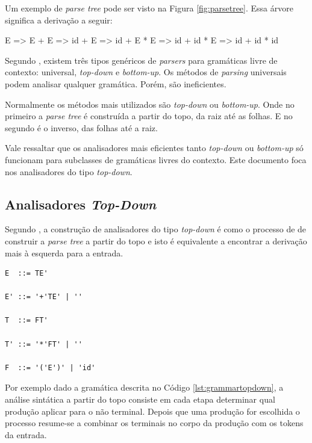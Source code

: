 Um exemplo de \textit{parse tree} pode ser visto na Figura \ref{fig:parsetree}. Essa árvore significa a derivação
a seguir:

\begin{center}
    E => E + E => id + E => id + E * E => id + id * E => id + id * id
\end{center}

Segundo \cite{aho2006}, existem três tipos genéricos de \textit{parsers} para gramáticas 
livre de contexto: universal, \textit{top-down} e \textit{bottom-up}. Os métodos de \textit{parsing}
universais podem analisar qualquer gramática. Porém, são ineficientes.

Normalmente os métodos mais utilizados são  \textit{top-down} ou \textit{bottom-up}. Onde no primeiro
a \textit{parse tree} é construída a partir do topo, da raiz até as folhas. E no segundo é o inverso,
das folhas até a raiz. 

Vale ressaltar que os analisadores mais eficientes tanto \textit{top-down} ou \textit{bottom-up}  
só funcionam para subclasses de gramáticas livres do contexto. Este documento foca nos analisadores
do tipo \textit{top-down}.

\subsection{Analisadores \textit{Top-Down}}

Segundo \cite{aho2006}, a construção de analisadores do tipo \textit{top-down} é como o processo de
de construir a \textit{parse tree} a partir do topo e isto é
equivalente a encontrar a derivação mais à esquerda para a entrada.

\begin{lstlisting}[caption=Exemplo de gramática para analisadores top-down,label={lst:grammartopdown}]
E  ::= TE'

E' ::= '+'TE' | ''

T  ::= FT'

T' ::= '*'FT' | ''

F  ::= '('E')' | 'id'
\end{lstlisting}

Por exemplo dado a gramática descrita no Código \ref{lst:grammartopdown}, a análise sintática a partir do topo
consiste em cada etapa determinar qual produção aplicar para o não terminal. Depois que uma produção for escolhida
o processo resume-se a combinar os terminais no corpo da produção com os tokens da entrada. 

